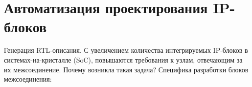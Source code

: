 
\chapter{Автоматизация проектирования IP-блоков}   %

Генерация RTL-описания.
С увеличением количества интегрируемых IP-блоков в системах-на-кристалле (SoC), повышаются требования к узлам, отвечающим за их межсоединение.
Почему возникла такая задача? Специфика разработки блоков межсоединения:

\clearpage

